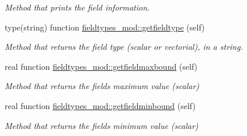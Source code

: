 \begin{DoxyCompactItemize}
\begin{DoxyCompactList}\small\item\em Method that prints the field information. \end{DoxyCompactList}\item 
type(string) function \mbox{\hyperlink{namespacefieldtypes__mod_a5faf9c157541acaa9681be2d59eda850}{fieldtypes\+\_\+mod\+::getfieldtype}} (self)
\begin{DoxyCompactList}\small\item\em Method that returns the field type (scalar or vectorial), in a string. \end{DoxyCompactList}\item 
real function \mbox{\hyperlink{namespacefieldtypes__mod_a2f817d22e8ca12aea1c9468c365f6460}{fieldtypes\+\_\+mod\+::getfieldmaxbound}} (self)
\begin{DoxyCompactList}\small\item\em Method that returns the field\textquotesingle{}s maximum value (scalar) \end{DoxyCompactList}\item 
real function \mbox{\hyperlink{namespacefieldtypes__mod_a6811e4246f656bb9074955c5c7c107e8}{fieldtypes\+\_\+mod\+::getfieldminbound}} (self)
\begin{DoxyCompactList}\small\item\em Method that returns the field\textquotesingle{}s minimum value (scalar) \end{DoxyCompactList}\end{DoxyCompactItemize}

